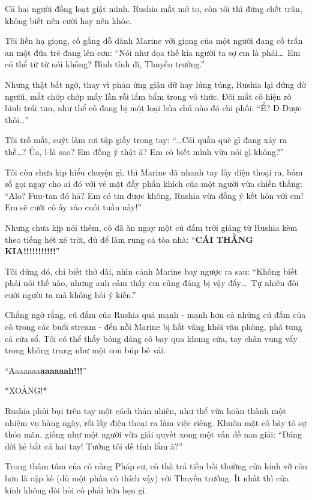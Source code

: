 \documentclass[../main.tex]{subfiles}
\begin{document}

Cả hai người đồng loạt giật mình. Rushia mắt mở to, còn tôi thì đứng chết trân, không biết nên cười hay nên khóc.

Tôi liền hạ giọng, cố gắng dỗ dành Marine với giọng của một người đang cố trấn an một đứa trẻ đang lên cơn: ``Nói như dọa thế kia người ta sợ em là phải\dots\ Em có thể từ từ nói không? Bình tĩnh đi, Thuyền trưởng.''

Nhưng thật bất ngờ, thay vì phản ứng giận dữ hay lúng túng, Rushia lại đứng đờ người, mắt chớp chớp mấy lần rồi lẩm bẩm trong vô thức. Đôi mắt cô hiện rõ hình trái tim, như thể cô đang bị một loại bùa chú nào đó chi phối: ``Ể? Đ-Được thôi\dots''

Tôi trố mắt, suýt làm rơi tập giấy trong tay: ``\dots  Cái quần què gì đang xảy ra thế\dots? Ủa, l-là sao? Em đồng ý thật á? Em có biết mình vừa nói gì không?''

Tôi còn chưa kịp hiểu chuyện gì, thì Marine đã nhanh tay lấy điện thoại ra, bấm số gọi ngay cho ai đó với vẻ mặt đầy phấn khích của một người vừa chiến thắng: ``Alo? Fuu-tan đó hả? Em có tin được không, Rushia vừa đồng ý kết hôn với em! Em sẽ cưới cô ấy vào cuối tuần này!''

Nhưng chưa kịp nói thêm, cô đã ăn ngay một cú đấm trời giáng từ Rushia kèm theo tiếng hét xé trời, đủ để làm rung cả tòa nhà: ``\textbf{CÁI THẰNG KIA!!!!!!!!!!!}''


Tôi đứng đó, chỉ biết thở dài, nhìn cảnh Marine bay ngược ra sau: ``Không biết phải nói thế nào, nhưng anh cảm thấy em cũng đáng bị vậy đấy\dots\ Tự nhiên đòi cưới người ta mà không hỏi ý kiến.''

Chẳng ngờ rằng, cú đấm của Rushia quá mạnh - mạnh hơn cả những cú đấm của cô trong các buổi stream - đến nỗi Marine bị hất văng khỏi văn phòng, phá tung cả cửa sổ. Tôi có thể thấy bóng dáng cô bay qua khung cửa, tay chân vung vẩy trong không trung như một con búp bê vải.

``Aaaaaaa\textbf{aaaaaah!!!}''

*XOẢNG!*

Rushia phủi bụi trên tay một cách thản nhiên, như thể vừa hoàn thành một nhiệm vụ hàng ngày, rồi lấy điện thoại ra làm việc riêng. Khuôn mặt cô bày tỏ sự thỏa mãn, giống như một người vừa giải quyết xong một vấn đề nan giải: ``Đáng đời kẻ bắt cá hai tay! Tưởng tôi dễ tính lắm à?''

Trong thâm tâm của cô nàng Pháp sư, cô thà trả tiền bồi thường cửa kính vỡ còn hơn là cặp kè (dù một phần cô thích vậy) với Thuyền trưởng. Ít nhất thì cửa kính không đòi hỏi cô phải hứa hẹn gì.
\end{document}
